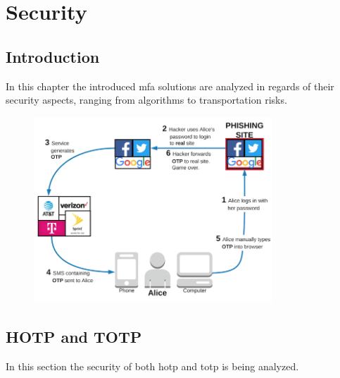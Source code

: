 \chapter{Security}

\section{Introduction}

In this chapter the introduced \gls{mfa} solutions are analyzed in regards of their security aspects, ranging from algorithms to transportation risks.

\begin{figure}[hbt]
  \centering
\includegraphics[width=0.8\textwidth]{pics/06---phishing-attack-2.png}
  \caption{}
\end{figure}

\section{HOTP and TOTP}

In this section the security of both \gls{hotp} and \gls{totp} is being analyzed.

